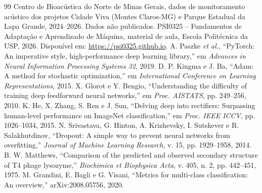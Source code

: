 \documentclass{sbrt}
\begin{document}
\begin{thebibliography}{99}
 Centro de Bioacústica do Norte de Minas Gerais, dados de monitoramento acústico dos projetos Cidade Viva (Montes Claros-MG) e Parque Estadual da Lapa Grande, 2024--2026. Dados não publicados.
 PSI0325 -- Fundamentos de Adaptação e Aprendizado de Máquina, material de aula, Escola Politécnica da USP, 2026. Disponível em: \url{https://psi0325.github.io}.
 A. Paszke \textit{et al.}, ``PyTorch: An imperative style, high-performance deep learning library,'' em \textit{Advances in Neural Information Processing Systems 32}, 2019.
 D. P. Kingma e J. Ba, ``Adam: A method for stochastic optimization,'' em \textit{International Conference on Learning Representations}, 2015.
 X. Glorot e Y. Bengio, ``Understanding the difficulty of training deep feedforward neural networks,'' em \textit{Proc. AISTATS}, pp. 249--256, 2010.
 K. He, X. Zhang, S. Ren e J. Sun, ``Delving deep into rectifiers: Surpassing human-level performance on ImageNet classification,'' em \textit{Proc. IEEE ICCV}, pp. 1026--1034, 2015.
 N. Srivastava, G. Hinton, A. Krizhevsky, I. Sutskever e R. Salakhutdinov, ``Dropout: A simple way to prevent neural networks from overfitting,'' \textit{Journal of Machine Learning Research}, v. 15, pp. 1929--1958, 2014.
 B. W. Matthews, ``Comparison of the predicted and observed secondary structure of T4 phage lysozyme,'' \textit{Biochimica et Biophysica Acta}, v. 405, n. 2, pp. 442--451, 1975.
 M. Grandini, E. Bagli e G. Visani, ``Metrics for multi-class classification: An overview,'' arXiv:2008.05756, 2020.
\end{thebibliography}
\end{document}
